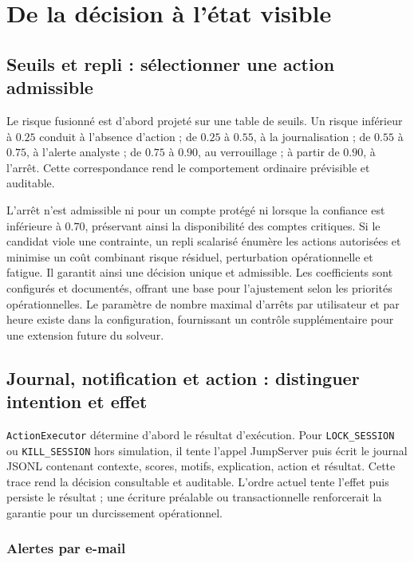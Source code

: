 \documentclass[11pt,a4paper,oneside]{report}
\theoremstyle{definition}
\theoremstyle{plain}
\begin{document}
\section{De la décision à l'état visible}

\subsection{Seuils et repli : sélectionner une action admissible}

Le risque fusionné est d'abord projeté sur une table de seuils. Un risque
inférieur à \(0.25\) conduit à l'absence d'action ; de \(0.25\) à \(0.55\), à
la journalisation ; de \(0.55\) à \(0.75\), à l'alerte analyste ; de \(0.75\)
à \(0.90\), au verrouillage ; à partir de \(0.90\), à l'arrêt. Cette
correspondance rend le comportement ordinaire prévisible et auditable.

L'arrêt n'est admissible ni pour un compte protégé ni lorsque la confiance est
inférieure à \(0.70\), préservant ainsi la disponibilité des comptes critiques.
Si le candidat viole une contrainte, un repli scalarisé énumère les actions
autorisées et minimise un coût combinant risque résiduel, perturbation
opérationnelle et fatigue. Il garantit ainsi une décision unique et
admissible. Les coefficients sont configurés et documentés, offrant une base
pour l'ajustement selon les priorités opérationnelles. Le paramètre de nombre
maximal d'arrêts par utilisateur et par heure existe dans la configuration,
fournissant un contrôle supplémentaire pour une extension future du solveur.

\subsection{Journal, notification et action : distinguer intention et effet}

\texttt{ActionExecutor} détermine d'abord le résultat d'exécution. Pour
\texttt{LOCK\_SESSION} ou \texttt{KILL\_SESSION} hors simulation, il tente
l'appel JumpServer puis écrit le journal JSONL contenant contexte, scores,
motifs, explication, action et résultat. Cette trace rend la décision
consultable et auditable. L'ordre actuel tente l'effet puis persiste le
résultat ; une écriture préalable ou transactionnelle renforcerait la
garantie pour un durcissement opérationnel.

\subsubsection{Alertes par e-mail}
\end{document}
